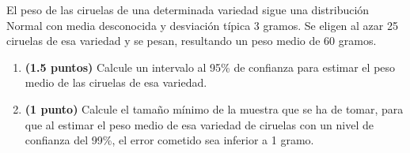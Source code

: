 
El peso de las ciruelas de una determinada variedad sigue una distribución Normal con media desconocida y desviación típica 3 gramos. Se eligen al azar 25 ciruelas de esa variedad y se pesan, resultando un peso medio de 60 gramos.
\begin{enumerate}[label=\alph*)]
\item \textbf{(1.5 puntos)} Calcule un intervalo al 95\% de confianza para estimar el peso medio de las ciruelas de esa variedad.
\item \textbf{(1 punto)} Calcule el tamaño mínimo de la muestra que se ha de tomar, para que al estimar el peso medio de esa variedad de ciruelas con un nivel de confianza del 99\%, el error cometido sea inferior a 1 gramo.
\end{enumerate}
